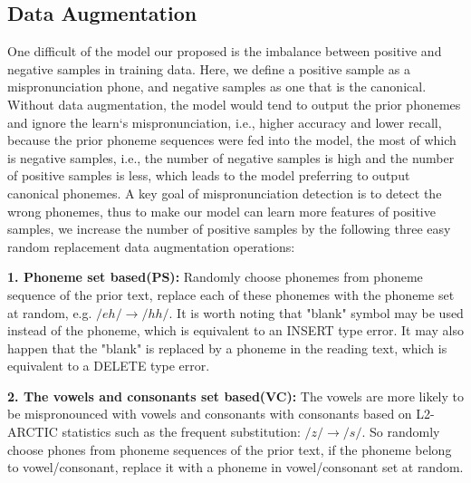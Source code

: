 \documentclass[a4paper]{article}
\begin{document}
\subsection{Data Augmentation}
One difficult of the model our proposed is the imbalance between positive and negative samples in training data. Here, we define a positive sample as a mispronunciation phone, and negative samples as one that is the canonical. Without data augmentation, the model would tend to output the prior phonemes and ignore the learn‘s mispronunciation, i.e., higher accuracy and lower recall, because the prior phoneme sequences were fed into the model, the most of which is negative samples, i.e., the number of negative samples is high and the number of positive samples is less, which leads to the model preferring to output canonical phonemes.  A key goal of mispronunciation detection is to detect the wrong phonemes, thus to make our model can learn more features of positive samples, we increase the number of positive samples by the following three easy random replacement data augmentation operations:


\noindent\textbf{1. Phoneme set based(PS):} Randomly choose phonemes from phoneme sequence of the prior text, replace each of these phonemes with the phoneme set at random, e.g. $ /eh/\to/hh/$. It is worth noting that "blank" symbol may be used instead of the phoneme, which is equivalent to an INSERT type error. It may also happen that the "blank" is replaced by a phoneme in the reading text, which is equivalent to a DELETE type error. 

\noindent\textbf{2. The vowels and consonants set based(VC):} The vowels are more likely to be mispronounced with vowels and consonants with consonants based on L2-ARCTIC statistics \cite{l2arctic}  such as the frequent substitution: $ /z/\to/s/$. So randomly choose phones from phoneme sequences of the prior text, if the phoneme belong to vowel/consonant, replace it with a phoneme in vowel/consonant set at random.
\end{document}
